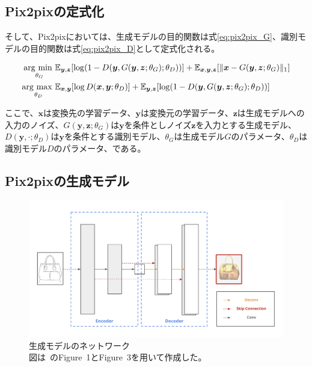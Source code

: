 \subsection{Pix2pixの定式化}

そして、Pix2pixにおいては、生成モデルの目的関数は式\ref{eq:pix2pix_G}、識別モデルの目的関数は式\ref{eq:pix2pix_D}として定式化される。

\begin{align}
    \label{eq:pix2pix_G}
    \mathop{\rm arg~min~}\limits _{\theta_G}& \mathbb{E}_{\boldsymbol{y}, \boldsymbol{z}}[\log (1-D(\boldsymbol{y}, G(\boldsymbol{y}, \boldsymbol{z}; \theta_G); \theta_D))]+\mathbb{E}_{\boldsymbol{x}, \boldsymbol{y}, \boldsymbol{z}}[\|\boldsymbol{x}-G(\boldsymbol{y}, \boldsymbol{z}; \theta_G)\|_{1}]\\
    \label{eq:pix2pix_D}
    \mathop{\rm arg~max~}\limits _{\theta_D}& \mathbb{E}_{\boldsymbol{x}, \boldsymbol{y}}[\log D(\boldsymbol{x}, \boldsymbol{y}; \theta_D)]+\mathbb{E}_{\boldsymbol{y}, \boldsymbol{z}}[\log (1-D(\boldsymbol{y}, G(\boldsymbol{y}, \boldsymbol{z}; \theta_G); \theta_D))]
\end{align}

ここで、$\boldsymbol{x}$は変換先の学習データ、$\boldsymbol{y}$は変換元の学習データ、$\boldsymbol{z}$は生成モデルへの入力のノイズ、$G(\boldsymbol{y},\boldsymbol{z};\theta_G)$は$\boldsymbol{y}$を条件としノイズ$\boldsymbol{z}$を入力とする生成モデル、$D(\boldsymbol{y},\cdot;\theta_D)$は$\boldsymbol{y}$を条件とする識別モデル、$\theta_G$は生成モデル$G$のパラメータ、$\theta_D$は識別モデル$D$のパラメータ、である。

\subsection{Pix2pixの生成モデル}

\begin{figure}[b]
\begin{center}
\includegraphics[width=0.8\hsize]{figure/u-net.png}
\caption{生成モデルのネットワーク\\
図は~\cite{pix2pix}のFigure~1とFigure~3を用いて作成した。}
\label{fig:u-net}
\end{center}
\end{figure}


